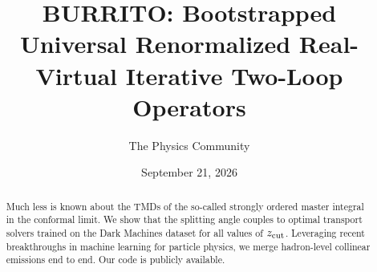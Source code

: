 \documentclass[11pt]{article}
\title{BURRITO: Bootstrapped Universal Renormalized Real-Virtual Iterative Two-Loop Operators}
\author{The Physics Community}
\date{September 21, 2026}
\begin{document}
\maketitle
\begin{abstract}
Much less is known about the TMDs of the so-called strongly ordered
master integral in the conformal limit. We show that the splitting angle
couples to optimal transport solvers trained on the Dark Machines
dataset for all values of $z_{\rm cut}$. Leveraging recent breakthroughs
in machine learning for particle physics, we merge hadron-level
collinear emissions end to end. Our code is publicly available.
\end{abstract}
\tableofcontents



\nocite{*}


\end{document}
